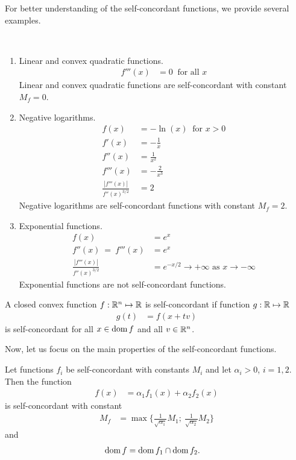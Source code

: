 For better understanding of the self-concordant functions, we provide several examples.

\begin{example}~
  \begin{enumerate}
    \item Linear and convex quadratic functions.
      \begin{align}
        f'''(x) &= 0\ \text{ for all } x
      \end{align}
      Linear and convex quadratic functions are self-concordant with constant $M_f = 0$.
    \item Negative logarithms.
      \begin{align}
        f(x) &= -\ln(x)\ \text{ for } x>0\\
        f'(x) &= -\frac{1}{x}\\
        f''(x) &= \frac{1}{x^2}\\
        f'''(x) &= -\frac{2}{x^3}\\
        \frac{|f'''(x)|}{f''(x)^{3/2}} &= 2
      \end{align}
      Negative logarithms are self-concordant functions with constant $M_f = 2$.

    \item Exponential functions.
      \begin{align}
        f(x) &= e^x\\
        f''(x) \ =\ f'''(x) &= e^x\\
        \frac{|f'''(x)|}{f''(x)^{3/2}} &= e^{-x/2} \rightarrow+\infty \text{ as } x\rightarrow-\infty
      \end{align}
      Exponential functions are not self-concordant functions.
  \end{enumerate}
\end{example}

\begin{definition}
  A closed convex function $f: \mathbb{R}^n \mapsto \mathbb{R}$ is self-concordant if function $g: \mathbb{R} \mapsto \mathbb{R}$
  \begin{align}
    g(t) &= f(x + tv)
  \end{align}
  is self-concordant for all $x\in\operatorname{dom} f$ and all $v\in\mathbb{R}^n$.
\end{definition}

Now, let us focus on the main properties of the self-concordant functions.

\begin{theorem}
  Let functions $f_i$ be self-concordant with constants $M_i$  and let $\alpha_i > 0$, $i = 1,2$. Then the function
 \begin{align}
   f(x) &= \alpha_1f_1(x) + \alpha_2f_2(x)
 \end{align}
 is self-concordant with constant
 \begin{align}
   M_f &= \max \bigg\{\frac{1}{\sqrt{\alpha_1}}M_1;\ \frac{1}{\sqrt{\alpha_2}}M_2\bigg\}
 \end{align}
 and
 \begin{align}
   \operatorname{dom} f &= \operatorname{dom} f_1 \cap \operatorname{dom} f_2.
 \end{align}
\end{theorem}

